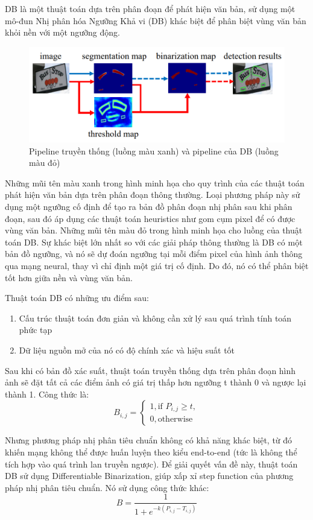 DB là một thuật toán dựa trên phân đoạn để phát hiện văn bản, sử dụng một mô-đun Nhị phân hóa Ngưỡng Khả vi (DB) khác biệt để phân biệt vùng văn bản khỏi nền với một ngưỡng động.

\begin{figure}[h]
    \includegraphics[scale=0.5]{images/tradition-db-pipeline.png}
    \centering
    \caption{Pipeline truyền thống (luồng màu xanh) và pipeline của DB (luồng màu đỏ) }
    \label{}
\end{figure}

Những mũi tên màu xanh trong hình minh họa cho quy trình của các thuật toán phát hiện văn bản dựa trên phân đoạn thông thường. Loại phương pháp này sử dụng một ngưỡng cố định để tạo ra bản đồ phân đoạn nhị phân sau khi phân đoạn, sau đó áp dụng các thuật toán heuristics như gom cụm pixel để có được vùng văn bản.
Những mũi tên màu đỏ trong hình minh họa cho luồng của thuật toán DB. Sự khác biệt lớn nhất so với các giải pháp thông thường là DB có một bản đồ ngưỡng, và nó sẽ dự đoán ngưỡng tại mỗi điểm pixel của hình ảnh thông qua mạng neural, thay vì chỉ định một giá trị cố định. Do đó, nó có thể phân biệt tốt hơn giữa nền và vùng văn bản.

Thuật toán DB có những ưu điểm sau:
\begin{enumerate}
    \item Cấu trúc thuật toán đơn giản và không cần xử lý sau quá trình tính toán phức tạp
    \item Dữ liệu nguồn mở của nó có độ chính xác và hiệu suất tốt
\end{enumerate}
Sau khi có bản đồ xác suất, thuật toán truyền thống dựa trên phân đoạn hình ảnh sẽ đặt tất cả các điểm ảnh có giá trị thấp hơn ngưỡng t thành 0 và ngược lại thành 1. Công thức là: 
$$
B_{i, j} = \begin{cases}
    1, \text{if } P_{i, j} \geq t, \\
    0, \text{otherwise}
\end{cases} 
$$

Nhưng phương pháp nhị phân tiêu chuẩn không có khả năng khác biệt, từ đó khiến mạng không thể được huấn luyện theo kiểu end-to-end (tức là không thể tích hợp vào quá trình lan truyền ngược). Để giải quyết vấn đề này, thuật toán DB sử dụng Differentiable Binarization, giúp xấp xỉ step function của phương pháp nhị phân tiêu chuẩn. Nó sử dụng công thức khác:
\[
    \hat{B} = \frac{1}{1+e^{-k(P_{i, j} - T_{i, j})}}    
\]

